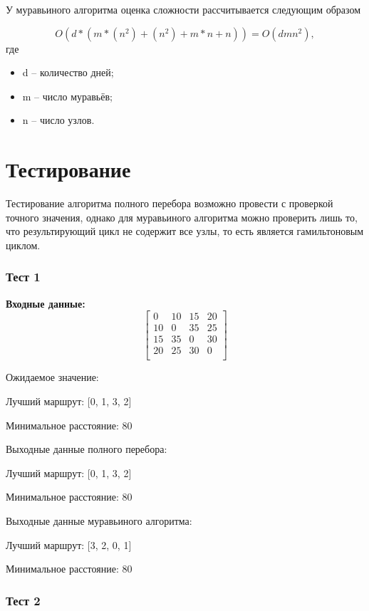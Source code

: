 У муравьиного алгоритма оценка сложности рассчитывается следующим образом

\begin{equation}
	\label{eq:ant-o}
	O(d * (m * (n^2) + (n^2) + m*n + n)) = O(dmn^2),
\end{equation}
где
\begin{itemize}
	\item d -- количество дней;
	\item m -- число муравьёв;
	\item n -- число узлов.
\end{itemize}

\section{Тестирование}

Тестирование алгоритма полного перебора  возможно провести с проверкой точного значения, однако для муравьиного алгоритма можно проверить лишь то, что результирующий цикл не содержит все узлы, то есть является гамильтоновым циклом.

\subsubsection{Тест 1}

\textbf{Входные данные:}
\[
\begin{bmatrix}
    0 & 10 & 15 & 20 \\
    10 & 0 & 35 & 25 \\
    15 & 35 & 0 & 30 \\
    20 & 25 & 30 & 0 \\
\end{bmatrix}
\]

Ожидаемое значение:

Лучший маршрут: [0, 1, 3, 2]

Минимальное расстояние: 80

Выходные данные полного перебора:

Лучший маршрут: [0, 1, 3, 2]

Минимальное расстояние: 80


Выходные данные муравьиного алгоритма:

Лучший маршрут: [3, 2, 0, 1]

Минимальное расстояние: 80


\subsubsection{Тест 2}

